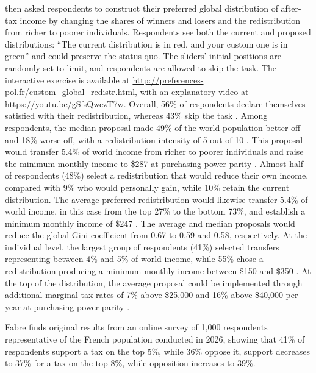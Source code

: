 \documentclass[11pt,a4paper]{article}
\begin{document}
\citet{fabre_public_2026} then asked respondents to construct their preferred global distribution of after-tax income by changing the shares of winners and losers and the redistribution from richer to poorer individuals. Respondents see both the current and proposed distributions: ``The current distribution is in red, and your custom one is in green'' and could preserve the status quo. The sliders' initial positions are randomly set to limit, and respondents are allowed to skip the task. The interactive exercise is available at \url{http://preferences-pol.fr/custom_global_redistr.html}, with an explanatory video at \url{https://youtu.be/gSfsQwczT7w}. Overall, 56\% of respondents declare themselves satisfied with their redistribution, whereas 43\% skip the task \citep[Figure S51]{fabre_public_2026}. Among respondents, the median proposal made 49\% of the world population better off and 18\% worse off, with a redistribution intensity of 5 out of 10 \citep[Figure S49]{fabre_public_2026}. This proposal would transfer 5.4\% of world income from richer to poorer individuals and raise the minimum monthly income to \$287 at purchasing power parity \citep[Figure S49]{fabre_public_2026}. Almost half of respondents (48\%) select a redistribution that would reduce their own income, compared with 9\% who would personally gain, while 10\% retain the current distribution. The average preferred redistribution would likewise transfer 5.4\% of world income, in this case from the top 27\% to the bottom 73\%, and establish a minimum monthly income of \$247 \citep[Figure S50]{fabre_public_2026}. The average and median proposals would reduce the global Gini coefficient from 0.67 to 0.59 and 0.58, respectively. At the individual level, the largest group of respondents (41\%) selected transfers representing between 4\% and 5\% of world income, while 55\% chose a redistribution producing a minimum monthly income between \$150 and \$350 \citep[Figure S56-57]{fabre_public_2026}. At the top of the distribution, the average proposal could be implemented through additional marginal tax rates of 7\% above \$25,000 and 16\% above \$40,000 per year at purchasing power parity \citep[Figure S69]{fabre_public_2026}.

Fabre finds original results from an online survey of 1,000 respondents representative of the French population conducted in 2026, showing that 41\% of respondents support a tax on the top 5\%, while 36\% oppose it, support decreases to 37\% for a tax on the top 8\%, while opposition increases to 39\%.
\end{document}
